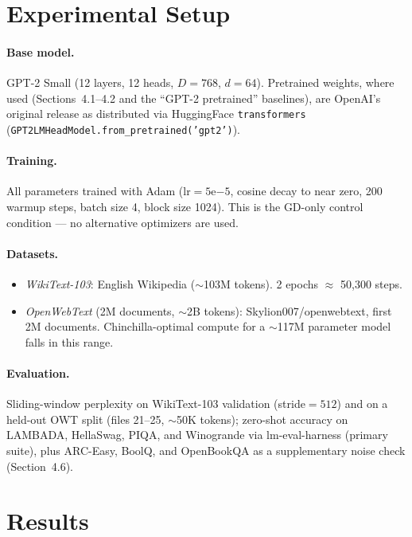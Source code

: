 \documentclass[11pt]{article}
\begin{document}
\section{Experimental Setup}

\paragraph{Base model.} GPT-2 Small (12 layers, 12 heads, $D=768$, $d=64$). Pretrained weights, where used (Sections~4.1--4.2 and the ``GPT-2 pretrained'' baselines), are OpenAI's original release as distributed via HuggingFace \texttt{transformers} (\texttt{GPT2LMHeadModel.from\_pretrained('gpt2')}).

\paragraph{Training.} All parameters trained with Adam (lr$=5\mathrm{e}{-5}$, cosine decay to near zero, 200 warmup steps, batch size 4, block size 1024). This is the GD-only control condition --- no alternative optimizers are used.

\paragraph{Datasets.}
\begin{itemize}
\item \emph{WikiText-103}: English Wikipedia ($\sim$103M tokens). 2 epochs $\approx$ 50{,}300 steps.
\item \emph{OpenWebText} (2M documents, $\sim$2B tokens): Skylion007/openwebtext, first 2M documents. Chinchilla-optimal compute for a $\sim$117M parameter model falls in this range.
\end{itemize}

\paragraph{Evaluation.} Sliding-window perplexity on WikiText-103 validation (stride$=512$) and on a held-out OWT split (files 21--25, $\sim$50K tokens); zero-shot accuracy on LAMBADA, HellaSwag, PIQA, and Winogrande via lm-eval-harness (primary suite), plus ARC-Easy, BoolQ, and OpenBookQA as a supplementary noise check (Section~4.6).

\section{Results}
\end{document}
